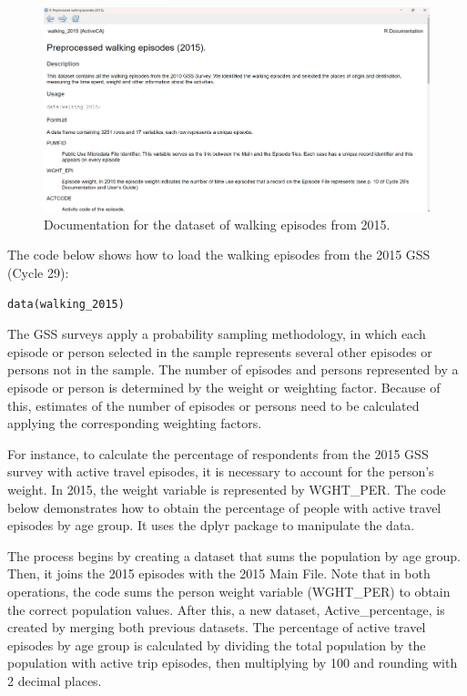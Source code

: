 \documentclass[Royal,times,sageh]{sagej}
\begin{document}
\begin{figure}

{\centering \includegraphics[width=1\linewidth]{Manuscript-figures/walking-2015-documentation} 

}

\caption{Documentation for the dataset of walking episodes from 2015.}\label{fig:walking_documentation}
\end{figure}

The code below shows how to load the walking episodes from the 2015 GSS
(Cycle 29):

\begin{verbatim}
data(walking_2015)
\end{verbatim}

The GSS surveys apply a probability sampling methodology, in which each
episode or person selected in the sample represents several other
episodes or persons not in the sample. The number of episodes and
persons represented by a episode or person is determined by the weight
or weighting factor. Because of this, estimates of the number of
episodes or persons need to be calculated applying the corresponding
weighting factors.

For instance, to calculate the percentage of respondents from the 2015
GSS survey with active travel episodes, it is necessary to account for
the person's weight. In 2015, the weight variable is represented by
WGHT\_PER. The code below demonstrates how to obtain the percentage of
people with active travel episodes by age group. It uses the dplyr
package \citep{dplyr2023} to manipulate the data.

The process begins by creating a dataset that sums the population by age
group. Then, it joins the 2015 episodes with the 2015 Main File. Note
that in both operations, the code sums the person weight variable
(WGHT\_PER) to obtain the correct population values. After this, a new
dataset, Active\_percentage, is created by merging both previous
datasets. The percentage of active travel episodes by age group is
calculated by dividing the total population by the population with
active trip episodes, then multiplying by 100 and rounding with 2
decimal places.
\end{document}
